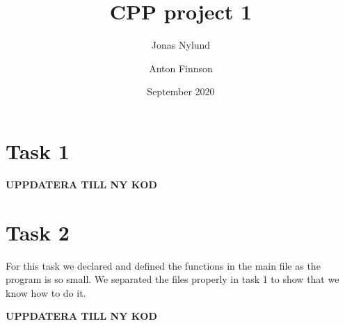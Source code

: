\documentclass{article}
\title{CPP project 1}
\author{Jonas Nylund \and Anton Finnson}
\date{September 2020}
\begin{document}
\maketitle

\section{Task 1}

\textbf{UPPDATERA TILL NY KOD}


\newpage
\section{Task 2}
For this task we declared and defined the functions in the main file as the program is so small. We separated the files properly in task 1 to show that we know how to do it.

\textbf{UPPDATERA TILL NY KOD}

\end{document}
